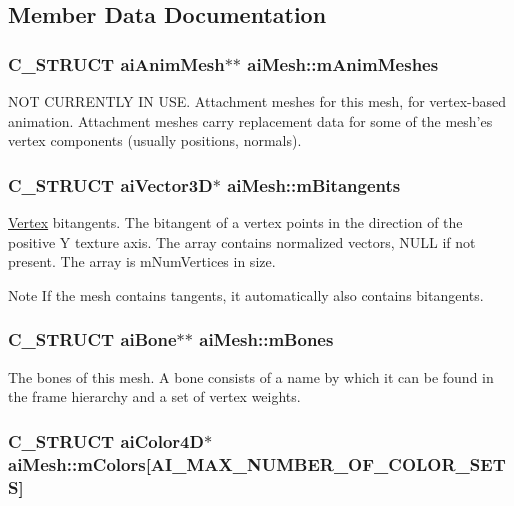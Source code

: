 \subsection{Member Data Documentation}
\hypertarget{structai_mesh_a5078f7db7e99ed05db89dfa412f0e990}{
\subsubsection[{m\+Anim\+Meshes}]{\setlength{\rightskip}{0pt plus 5cm}C\+\_\+\+S\+T\+R\+U\+C\+T {\bf ai\+Anim\+Mesh}$\ast$$\ast$ ai\+Mesh\+::m\+Anim\+Meshes}}\label{structai_mesh_a5078f7db7e99ed05db89dfa412f0e990}
N\+O\+T C\+U\+R\+R\+E\+N\+T\+L\+Y I\+N U\+S\+E. Attachment meshes for this mesh, for vertex-\/based animation. Attachment meshes carry replacement data for some of the mesh'es vertex components (usually positions, normals). \hypertarget{structai_mesh_ab2a81bfe1731f01271ebab274a8f01c4}{
\subsubsection[{m\+Bitangents}]{\setlength{\rightskip}{0pt plus 5cm}C\+\_\+\+S\+T\+R\+U\+C\+T {\bf ai\+Vector3\+D}$\ast$ ai\+Mesh\+::m\+Bitangents}}\label{structai_mesh_ab2a81bfe1731f01271ebab274a8f01c4}
\hyperlink{struct_vertex}{Vertex} bitangents. The bitangent of a vertex points in the direction of the positive Y texture axis. The array contains normalized vectors, N\+U\+L\+L if not present. The array is m\+Num\+Vertices in size. \begin{DoxyNote}{Note}
If the mesh contains tangents, it automatically also contains bitangents. 
\end{DoxyNote}
\hypertarget{structai_mesh_a0c0582a7f45b340b6a33552c53232539}{
\subsubsection[{m\+Bones}]{\setlength{\rightskip}{0pt plus 5cm}C\+\_\+\+S\+T\+R\+U\+C\+T {\bf ai\+Bone}$\ast$$\ast$ ai\+Mesh\+::m\+Bones}}\label{structai_mesh_a0c0582a7f45b340b6a33552c53232539}
The bones of this mesh. A bone consists of a name by which it can be found in the frame hierarchy and a set of vertex weights. \hypertarget{structai_mesh_ad9215f67bd0c2277b10775a8adb66b96}{
\subsubsection[{m\+Colors}]{\setlength{\rightskip}{0pt plus 5cm}C\+\_\+\+S\+T\+R\+U\+C\+T {\bf ai\+Color4\+D}$\ast$ ai\+Mesh\+::m\+Colors\mbox{[}A\+I\+\_\+\+M\+A\+X\+\_\+\+N\+U\+M\+B\+E\+R\+\_\+\+O\+F\+\_\+\+C\+O\+L\+O\+R\+\_\+\+S\+E\+T\+S\mbox{]}}}\label{structai_mesh_ad9215f67bd0c2277b10775a8adb66b96}
